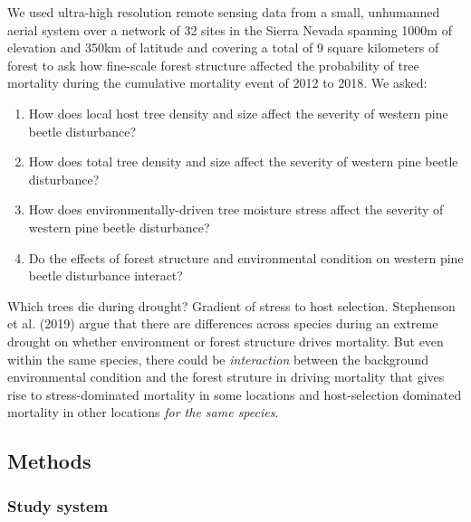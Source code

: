 \documentclass[]{article}
\begin{document}
We used ultra-high resolution remote sensing data from a small,
unhumanned aerial system over a network of 32 sites in the Sierra Nevada
spanning 1000m of elevation and 350km of latitude and covering a total
of 9 square kilometers of forest to ask how fine-scale forest structure
affected the probability of tree mortality during the cumulative
mortality event of 2012 to 2018. We asked:

\begin{enumerate}
\def\labelenumi{\arabic{enumi}.}
\item
  How does local host tree density and size affect the severity of
  western pine beetle disturbance?
\item
  How does total tree density and size affect the severity of western
  pine beetle disturbance?
\item
  How does environmentally-driven tree moisture stress affect the
  severity of western pine beetle disturbance?
\item
  Do the effects of forest structure and environmental condition on
  western pine beetle disturbance interact?
\end{enumerate}

Which trees die during drought? Gradient of stress to host selection.
Stephenson et al. (2019) argue that there are differences across species
during an extreme drought on whether environment or forest structure
drives mortality. But even within the same species, there could be
\emph{interaction} between the background environmental condition and
the forest struture in driving mortality that gives rise to
stress-dominated mortality in some locations and host-selection
dominated mortality in other locations \emph{for the same species}.

\subsection{Methods}\label{methods}

\subsubsection{Study system}\label{study-system}
\end{document}
